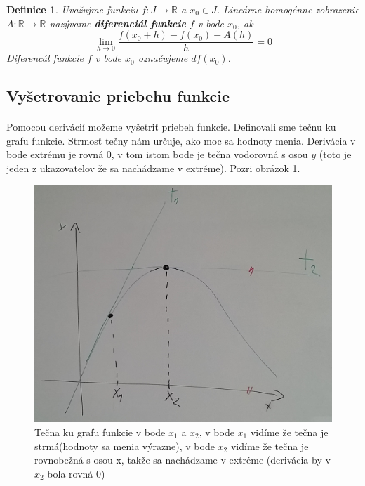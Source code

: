 \documentclass[12pt,a4paper]{article}
\newtheorem{definition}{Definice}
\begin{document}
\begin{definition}
	Uvažujme funkciu $f:J\rightarrow \mathds{R}$ a $x_{0}\in J$. Lineárne homogénne zobrazenie $A:\mathds{R}\rightarrow \mathds{R}$ nazývame \textbf{diferenciál funkcie} $f$ v bode $x_{0}$, ak $$\lim_{h\rightarrow 0}\frac{f(x_{0}+h) - f(x_{0})-A(h)}{h}=0$$ Diferencál funkcie $f$ v bode $x_{0}$ označujeme $df(x_{0})$.
\end{definition}

\subsection{Vyšetrovanie priebehu funkcie}
\paragraph{}
Pomocou derivácií možeme vyšetriť priebeh funkcie. Definovali sme tečnu ku grafu funkcie. Strmosť tečny nám určuje, ako moc sa hodnoty menia. Derivácia v bode extrému je rovná 0, v tom istom bode je tečna vodorovná s osou $y$ (toto je jeden z ukazovatelov že sa nachádzame v extréme). Pozri obrázok \ref{tecna}.

\begin{figure}[ht]
	\begin{center}
		\includegraphics[scale=0.24]{img/tecna}
	\end{center}
	\caption{Tečna ku grafu funkcie v bode $x_{1}$ a $x_{2}$, v bode $x_{1}$ vidíme že tečna je strmá(hodnoty sa menia výrazne), v bode $x_{2}$ vidíme že tečna je rovnobežná s osou x, takže sa nachádzame v extréme (derivácia by v $x_{2}$ bola rovná 0)\label{tecna}}
\end{figure}
\end{document}
